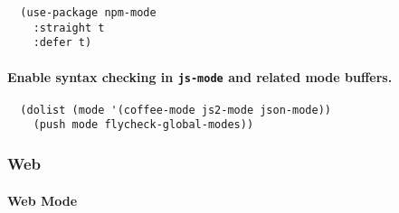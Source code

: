 \documentclass[11pt]{article}
\begin{document}
\begin{verbatim}
  (use-package npm-mode
    :straight t
    :defer t)
\end{verbatim}
\paragraph*{Enable syntax checking in \texttt{js-mode} and related mode buffers.}
\label{sec:org7be645f}

\begin{verbatim}
  (dolist (mode '(coffee-mode js2-mode json-mode))
    (push mode flycheck-global-modes))
\end{verbatim}

\subsubsection*{Web}
\label{sec:org1f47585}
\paragraph*{Web Mode}
\label{sec:org6b01c90}
\end{document}
